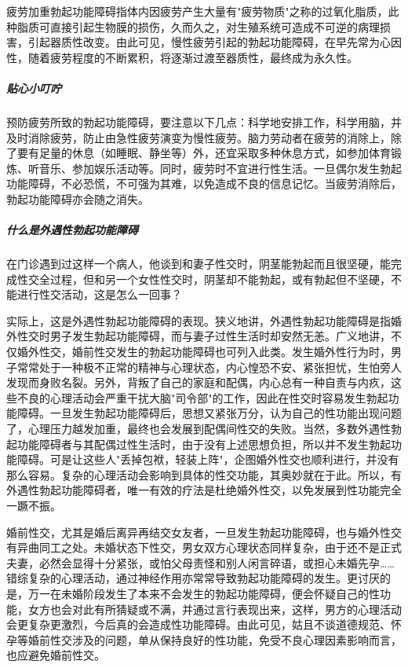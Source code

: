 疲劳加重勃起功能障碍指体内因疲劳产生大量有"疲劳物质"之称的过氧化脂质，此种脂质可直接引起生物膜的损伤，久而久之，对生殖系统可造成不可逆的病理损害，引起器质性改变。由此可见，慢性疲劳引起的勃起功能障碍，在早先常为心因性，随着疲劳程度的不断累积，将逐渐过渡至器质性，最终成为永久性。

\subparagraph{贴心小叮咛}

预防疲劳所致的勃起功能障碍，要注意以下几点：科学地安排工作，科学用脑，并及时消除疲劳，防止由急性疲劳演变为慢性疲劳。脑力劳动者在疲劳的消除上，除了要有足量的休息（如睡眠、静坐等）外，还宜采取多种休息方式，如参加体育锻炼、听音乐、参加娱乐活动等。同时，疲劳时不宜进行性生活。一旦偶尔发生勃起功能障碍，不必恐慌，不可强为其难，以免造成不良的信息记忆。当疲劳消除后，勃起功能障碍亦会随之消失。

\subparagraph{什么是外遇性勃起功能障碍}

在门诊遇到过这样一个病人，他谈到和妻子性交时，阴茎能勃起而且很坚硬，能完成性交全过程，但和另一个女性性交时，阴茎却不能勃起，或有勃起但不坚硬，不能进行性交活动，这是怎么一回事？

实际上，这是外遇性勃起功能障碍的表现。狭义地讲，外遇性勃起功能障碍是指婚外性交时男子发生勃起功能障碍，而与妻子过性生活时却安然无恙。广义地讲，不仅婚外性交，婚前性交发生的勃起功能障碍也可列入此类。发生婚外性行为时，男子常常处于一种极不正常的精神与心理状态，内心惶恐不安、紧张担忧，生怕旁人发现而身败名裂。另外，背叛了自己的家庭和配偶，内心总有一种自责与内疚，这些不良的心理活动会严重干扰大脑"司令部"的工作，因此在性交时容易发生勃起功能障碍。一旦发生勃起功能障碍后，思想又紧张万分，认为自己的性功能出现问题了，心理压力越发加重，最终也会发展到配偶间性交的失败。当然，多数外遇性勃起功能障碍者与其配偶过性生活时，由于没有上述思想负担，所以并不发生勃起功能障碍。可是让这些人"丢掉包袱，轻装上阵"，企图婚外性交也顺利进行，并没有那么容易。复杂的心理活动会影响到具体的性交功能，其奥妙就在于此。所以，有外遇性勃起功能障碍者，唯一有效的疗法是杜绝婚外性交，以免发展到性功能完全一蹶不振。

婚前性交，尤其是婚后离异再结交女友者，一旦发生勃起功能障碍，也与婚外性交有异曲同工之处。未婚状态下性交，男女双方心理状态同样复杂，由于还不是正式夫妻，必然会显得十分紧张，或怕父母责怪和别人闲言碎语，或担心未婚先孕……错综复杂的心理活动，通过神经作用亦常常导致勃起功能障碍的发生。更讨厌的是，万一在未婚阶段发生了本来不会发生的勃起功能障碍，便会怀疑自己的性功能，女方也会对此有所猜疑或不满，并通过言行表现出来，这样，男方的心理活动会更复杂更激烈，今后真的会造成性功能障碍。由此可见，姑且不谈道德规范、怀孕等婚前性交涉及的问题，单从保持良好的性功能，免受不良心理因素影响而言，也应避免婚前性交。

